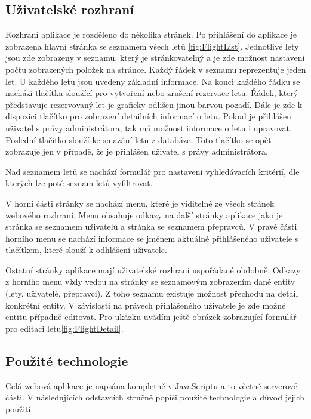 \documentclass[ing,male,java,dept460]{diploma}						%
\begin{document}
\subsection{Uživatelské rozhraní}
Rozhraní aplikace je rozděleno do několika stránek. Po přihlášení do aplikace je zobrazena hlavní stránka se seznamem všech letů \ref{fig:FlightList}. Jednotlivé lety jsou zde zobrazeny v seznamu, který je stránkovatelný a je zde možnost nastavení počtu zobrazených položek na stránce. Každý řádek v seznamu reprezentuje jeden let. U každého letu jsou uvedeny základní informace. Na konci každého řádku se nachází tlačítka sloužící pro vytvoření nebo zrušení rezervace letu. Řádek, který představuje rezervovaný let je graficky odlišen jinou barvou pozadí. Dále je zde k dispozici tlačítko pro zobrazení detailních informací o letu. Pokud je přihlášen uživatel s právy administrátora, tak má možnost informace o letu i upravovat. Poslední tlačítko slouží ke smazání letu z databáze. Toto tlačítko se opět zobrazuje jen v případě, že je přihlášen uživatel s právy administrátora.


Nad seznamem letů se nachází formulář pro nastavení vyhledávacích kritérií, dle kterých lze poté seznam letů vyfiltrovat.

V horní části stránky se nachází menu, které je viditelné ze všech stránek webového rozhraní. Menu obsahuje odkazy na další stránky aplikace jako je stránka se seznamem uživatelů a stránka se seznamem přepravců. V pravé části horního menu se nachází informace se jménem aktuálně přihlášeného uživatele s tlačítkem, které slouží k odhlášení uživatele.

Ostatní stránky aplikace mají uživatelské rozhraní uspořádané obdobně. Odkazy z horního menu vždy vedou na stránky se seznamovým zobrazením dané entity (lety, uživatelé, přepravci). Z toho seznamu existuje možnost přechodu na detail konkrétní entity. V závislosti na právech přihlášeného uživatele je zde možné entitu případně editovat. Pro ukázku uvádím ještě obrázek zobrazující formulář pro editaci letu\ref{fig:FlightDetail}.


\subsection{Použité technologie}
\label{sec:Pouzite_technologie}
Celá webová aplikace je napsána kompletně v JavaScriptu a to včetně serverové části. V následujících odstavcích stručně popíši použité technologie a důvod jejich použití.
\end{document}
